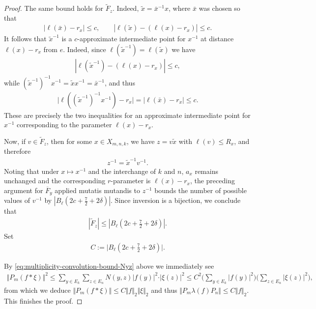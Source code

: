 \documentclass[12pt,a4paper,oneside,final,reqno]{amsart}
\theoremstyle{plain}
\theoremstyle{definition}
\begin{document}
\begin{proof}
    The same bound holds for $\tilde{F}_z$. Indeed, 
$\tilde{x}=\bar x^{-1}x$, where $\bar x$ was chosen so that
\begin{align*}
    |\ell(\bar x)-r_x|\leq c,
    \qquad
    |\ell(\tilde{x})-(\ell(x)-r_x)|\leq c.
\end{align*}
It follows that $\tilde{x}^{-1}$ is a $c$-approximate intermediate
point for $x^{-1}$ at distance $\ell(x)-r_x$ from $e$. Indeed, since $\ell(\tilde{x}^{-1}) = \ell(\tilde{x})$ we have
\begin{align*}
    |\ell(\tilde{x}^{-1})-(\ell(x)-r_x)|\leq c,
\end{align*}
while
$(\tilde{x}^{-1})^{-1}x^{-1}
    =\tilde{x} x^{-1}
    =\bar x^{-1}$,
and thus
\begin{align*}
     \bigl|\ell((\tilde{x}^{-1})^{-1}x^{-1})-r_x\bigr|
    =|\ell(\bar x)-r_x|
    \leq c.
\end{align*} 
These are precisely the two inequalities
for an approximate intermediate point for $x^{-1}$ corresponding to
the 
parameter $\ell(x)-r_x$.

Now, if $v\in\tilde{F}_z$, then for some $x\in X_{m,n,k}$, we have $z=v\tilde{x}$ with $\ell(v)\leq R_x$, 
and therefore
\begin{align*}
    z^{-1}=\tilde{x}^{-1}v^{-1}.
\end{align*}
Noting that under $x \mapsto x^{-1}$ and the interchange of $k$ and $n$, $a_x$ remains unchanged and the corresponding $r$-parameter is $\ell(x) - r_x$, the preceding argument for $\overline{F}_y$ applied mutatis mutandis to $z^{-1}$  bounds the number of possible
values of $v^{-1}$ by $|B_\ell\!\left(2c+\frac72+2\delta\right)|$. 
Since inversion is a bijection, we conclude that
\begin{align*}
    |\tilde{F}_z|
    \leq
    \left|B_\ell\!\left(2c+\frac72+2\delta\right)\right|.
\end{align*}
    Set 
    \begin{align*}
        C := \vert B_\ell(2c + \frac{7}{2} + 2\delta) \vert.
    \end{align*}
    
    By \eqref{eq:multiplicity-convolution-bound-Nyz} above we immediately see    
    \begin{align*}
         \Vert P_m (f*\xi) \Vert^2 \leq  \sum_{y \in E_k} \sum_{z\in E_n} N(y,z) \vert f(y) \vert^2 \cdot \vert \xi(z) \vert^2 \leq C^2 \bigg( \sum_{y\in E_k} \vert f(y) \vert^2 \bigg)\bigg( \sum_{z \in E_n} \vert \xi(z) \vert^2 \bigg),
    \end{align*}
    from which we deduce $\Vert P_m (f*\xi)\Vert \leq C \Vert f\Vert_2 \Vert \xi \Vert_2$ and thus $\Vert P_m \lambda(f) P_n \Vert \leq C \Vert f \Vert_2$. This finishes the proof. 
\end{proof}
\end{document}
